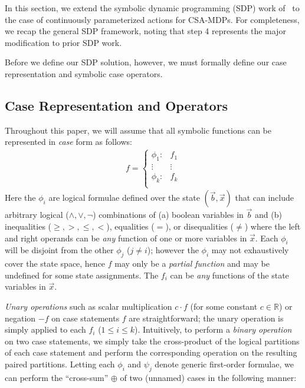 \documentclass[letterpaper]{article}
\begin{document}
In this section, we extend the symbolic dynamic programming (SDP)
work of~\cite{fomdp,sanner_uai11}
to the case of continuously parameterized actions for CSA-MDPs.  
For completeness, we recap the general SDP framework, noting that 
step 4 represents the major modification to prior SDP work.

Before we define our SDP solution, however, we must formally define our
case representation and symbolic case operators.

\subsection{Case Representation and Operators}

Throughout this paper, we will assume that all symbolic functions
can be represented in \emph{case} form as follows:
{%
\begin{align}
f = 
\begin{cases}
  \phi_1: & f_1 \\ 
 \vdots&\vdots\\ 
  \phi_k: & f_k \\ 
\end{cases} \label{eq:case}
\end{align}
}
Here the $\phi_i$ are logical formulae defined over the state
$(\vec{b},\vec{x})$ that can include arbitrary logical ($\land,\lor,\neg$)
combinations of (a) boolean variables in $\vec{b}$ and (b) 
inequalities ($\geq,>,\leq,<$), equalities ($=$), or disequalities ($\neq$)
where the left and right operands can be \emph{any} function of one or more 
variables in $\vec{x}$.  
Each $\phi_i$ will be disjoint from the other $\phi_j$ ($j \neq i$); 
however the $\phi_i$ may not exhaustively cover the state space, hence
$f$ may only be a \emph{partial function} and may be undefined for some
state assignments.
The $f_i$ can be \emph{any} functions of the state
variables in $\vec{x}$.  

\emph{Unary operations} such as scalar multiplication $c\cdot f$ (for
some constant $c \in \mathbb{R}$) or negation $-f$ on case statements
$f$ are straightforward; the unary operation is simply applied to each
$f_i$ ($1 \leq i \leq k$). Intuitively, to perform a \emph{binary
  operation} on two case statements, we simply take the cross-product
of the logical partitions of each case statement and perform the
corresponding operation on the resulting paired partitions.  Letting
each $\phi_i$ and $\psi_j$ denote generic first-order formulae, we can
perform the ``cross-sum'' $\oplus$ of two (unnamed) cases in the
following manner:
\end{document}
